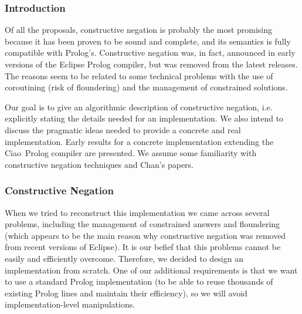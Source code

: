 \documentclass{llncs}
\newcommand{\ciao}{Ciao}
\begin{document}

\subsubsection{Introduction}
\label{introduction}
Of all the proposals, constructive negation \cite{Chan1,Chan2} is
probably the most promising because it has been proven to be sound and
complete, and its semantics is fully compatible with
Prolog's. Constructive negation was, in fact, announced in early
versions of the Eclipse Prolog compiler, but was removed from the
latest releases.  The reasons seem to be related to some technical
problems with the use of coroutining (risk of floundering) and the
management of constrained solutions.


Our goal is to give an algorithmic description of
constructive negation, i.e. explicitly stating the details needed for
an implementation. We also intend to discuss the pragmatic ideas
needed to provide a concrete and real implementation. Early results
for a concrete implementation extending the \ciao\ Prolog compiler are
presented.  We assume some familiarity with constructive negation
techniques and Chan's papers.


\subsubsection{Constructive Negation}
\label{constructive}

When we tried to reconstruct this
implementation we came across several problems, including the
management of constrained answers and floundering (which appears to be
the main reason why constructive negation was removed from recent
versions of Eclipse). It is our befief that this problems cannot be
easily and efficiently overcome. Therefore, we decided to design an
implementation from scratch.  One of our additional requirements is
that we want to use a standard Prolog implementation (to be able to
reuse thousands of existing Prolog lines and maintain their
efficiency), so we will avoid implementation-level manipulations.
\end{document}
